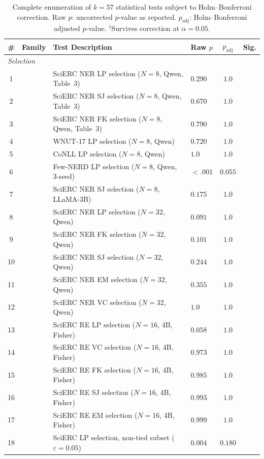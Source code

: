 \begin{table}[t]
\centering
\small
\caption{Complete enumeration of $k{=}57$ statistical tests subject to Holm--Bonferroni correction. Raw $p$: uncorrected $p$-value as reported. $p_{\text{adj}}$: Holm--Bonferroni adjusted $p$-value. $^\dagger$Survives correction at $\alpha{=}0.05$.}
\label{tab:holm_family}
\begin{tabular}{clllcc}
\toprule
\# & Family & Test Description & Raw $p$ & $p_{\text{adj}}$ & Sig. \\
\midrule
\multicolumn{6}{l}{\textit{Selection}} \\
1 & & SciERC NER LP selection ($N{=}8$, Qwen, Table~3) & $0.290$ & $1.0$ &  \\
2 & & SciERC NER SJ selection ($N{=}8$, Qwen, Table~3) & $0.670$ & $1.0$ &  \\
3 & & SciERC NER FK selection ($N{=}8$, Qwen, Table~3) & $0.790$ & $1.0$ &  \\
4 & & WNUT-17 LP selection ($N{=}8$, Qwen) & $0.720$ & $1.0$ &  \\
5 & & CoNLL LP selection ($N{=}8$, Qwen) & $1.0$ & $1.0$ &  \\
6 & & Few-NERD LP selection ($N{=}8$, Qwen, 3-seed) & ${<}.001$ & $0.055$ & \\
7 & & SciERC NER SJ selection ($N{=}8$, LLaMA-3B) & $0.175$ & $1.0$ &  \\
8 & & SciERC NER LP selection ($N{=}32$, Qwen) & $0.091$ & $1.0$ &  \\
9 & & SciERC NER FK selection ($N{=}32$, Qwen) & $0.101$ & $1.0$ &  \\
10 & & SciERC NER SJ selection ($N{=}32$, Qwen) & $0.244$ & $1.0$ &  \\
11 & & SciERC NER EM selection ($N{=}32$, Qwen) & $0.355$ & $1.0$ &  \\
12 & & SciERC NER VC selection ($N{=}32$, Qwen) & $1.0$ & $1.0$ &  \\
13 & & SciERC RE LP selection ($N{=}16$, 4B, Fisher) & $0.058$ & $1.0$ &  \\
14 & & SciERC RE VC selection ($N{=}16$, 4B, Fisher) & $0.973$ & $1.0$ &  \\
15 & & SciERC RE FK selection ($N{=}16$, 4B, Fisher) & $0.985$ & $1.0$ &  \\
16 & & SciERC RE SJ selection ($N{=}16$, 4B, Fisher) & $0.993$ & $1.0$ &  \\
17 & & SciERC RE EM selection ($N{=}16$, 4B, Fisher) & $0.999$ & $1.0$ &  \\
18 & & SciERC LP selection, non-tied subset ($\varepsilon{=}0.05$) & $0.004$ & $0.180$ &  \\

\end{tabular}
\end{table}
